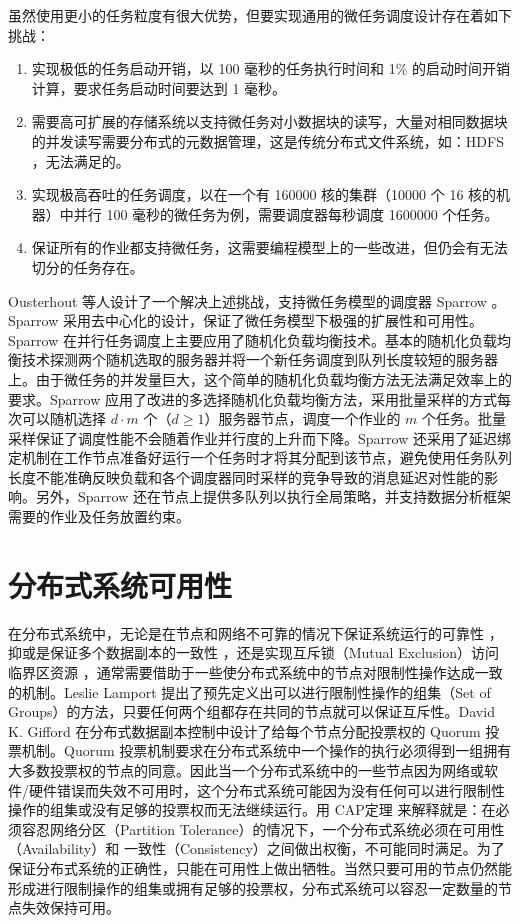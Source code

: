 虽然使用更小的任务粒度有很大优势，但要实现通用的微任务调度设计存在着如下挑战：
\begin{enumerate}
\item 实现极低的任务启动开销，以 100 毫秒的任务执行时间和 1\% 的启动时间开销计算，要求任务启动时间要达到 1 毫秒。
\item 需要高可扩展的存储系统以支持微任务对小数据块的读写，大量对相同数据块的并发读写需要分布式的元数据管理，这是传统分布式文件系统，如：HDFS \cite{hadoop:2014}，无法满足的。
\item 实现极高吞吐的任务调度，以在一个有 160000 核的集群（10000 个 16 核的机器）中并行 100 毫秒的微任务为例，需要调度器每秒调度 1600000 个任务。
\item 保证所有的作业都支持微任务，这需要编程模型上的一些改进，但仍会有无法切分的任务存在。
\end{enumerate}

Ousterhout 等人设计了一个解决上述挑战，支持微任务模型的调度器 Sparrow \cite{Ousterhout:2013:SDL:2517349.2522716}。Sparrow 采用去中心化的设计，保证了微任务模型下极强的扩展性和可用性。Sparrow 在并行任务调度上主要应用了随机化负载均衡技术。基本的随机化负载均衡技术探测两个随机选取的服务器并将一个新任务调度到队列长度较短的服务器上。由于微任务的并发量巨大，这个简单的随机化负载均衡方法无法满足效率上的要求。Sparrow 应用了改进的多选择随机化负载均衡方法，采用批量采样的方式每次可以随机选择 $d \cdot m$ 个（$d \geq 1$）服务器节点，调度一个作业的 $m$ 个任务。批量采样保证了调度性能不会随着作业并行度的上升而下降。Sparrow 还采用了延迟绑定机制在工作节点准备好运行一个任务时才将其分配到该节点，避免使用任务队列长度不能准确反映负载和各个调度器同时采样的竞争导致的消息延迟对性能的影响。另外，Sparrow 还在节点上提供多队列以执行全局策略，并支持数据分析框架需要的作业及任务放置约束。

\section{分布式系统可用性}
在分布式系统中，无论是在节点和网络不可靠的情况下保证系统运行的可靠性 \cite{Lamport197895}，抑或是保证多个数据副本的一致性 \cite{Gifford:1979:WVR:800215.806583}，还是实现互斥锁（Mutual Exclusion）访问临界区资源 \cite{Garcia-Molina:1985:AVD:4221.4223}，通常需要借助于一些使分布式系统中的节点对限制性操作达成一致的机制。Leslie Lamport \cite{Lamport197895} 提出了预先定义出可以进行限制性操作的组集（Set of Groups）的方法，只要任何两个组都存在共同的节点就可以保证互斥性。David K. Gifford \cite{Gifford:1979:WVR:800215.806583} 在分布式数据副本控制中设计了给每个节点分配投票权的 Quorum 投票机制。Quorum 投票机制要求在分布式系统中一个操作的执行必须得到一组拥有大多数投票权的节点的同意。因此当一个分布式系统中的一些节点因为网络或软件/硬件错误而失效不可用时，这个分布式系统可能因为没有任何可以进行限制性操作的组集或没有足够的投票权而无法继续运行。用 CAP定理 \cite{Fox:1999:HYS:822076.822436} 来解释就是：在必须容忍网络分区（Partition Tolerance）的情况下，一个分布式系统必须在可用性（Availability）和 一致性（Consistency）之间做出权衡，不可能同时满足。为了保证分布式系统的正确性，只能在可用性上做出牺牲。当然只要可用的节点仍然能形成进行限制操作的组集或拥有足够的投票权，分布式系统可以容忍一定数量的节点失效保持可用。

